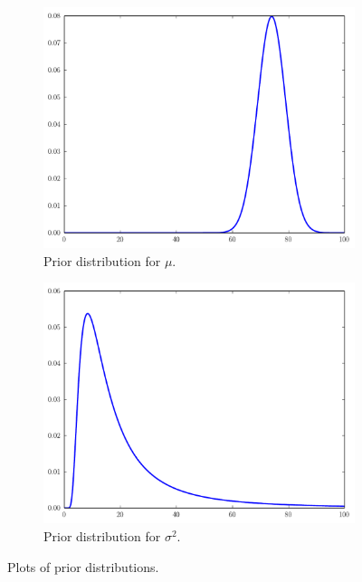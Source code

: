 \begin{figure}
\begin{subfigure}[b]{.49\textwidth}
\includegraphics[width=\textwidth]{mean_prior.pdf}
\caption{Prior distribution for $\mu$.}
\label{fig:mean_prior}
\end{subfigure}
\begin{subfigure}[b]{.49\textwidth}
\includegraphics[width=\textwidth]{variance_prior.pdf}
\caption{Prior distribution for $\sigma^{2}$.}
\label{fig:variance_prior}
\end{subfigure}
\caption{Plots of prior distributions.}
\end{figure}

